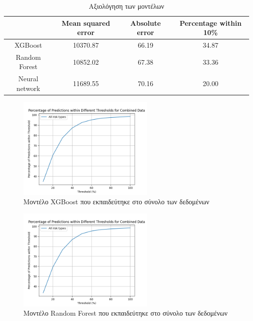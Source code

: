 \documentclass{llncs}
\begin{document}
\begin{table}[h]
    \centering
    \begin{tabular}{|c|c|c|c|} %
        \hline
         &Mean squared error & Absolute error & Percentage within 10\% \\ %
        \hline
        XGBoost & 10370.87 & 66.19 & 34.87 \\
        Random Forest & 10852.02 & 67.38 & 33.36 \\
        Neural network & 11689.55 & 70.16 & 20.00 \\
        \hline
    \end{tabular}
    \caption{Αξιολόγηση των μοντέλων}
    \label{tab:3x3table}
\end{table}

\begin{figure}
    \begin{center}
        \includegraphics[width=0.6\textwidth]{images/combined_trained_all_thresholds_xgb.png}
    \end{center}
    \caption{Μοντέλο XGBoost που εκπαιδεύτηκε στο σύνολο των δεδομένων}  
    \label{fig:XGBoost_result}  
\end{figure}

\begin{figure}
    \begin{center}
        \includegraphics[width=0.6\textwidth]{images/combined_trained_all_thresholds_random_forest.png}
    \end{center}
    \caption{Μοντέλο Random Forest που εκπαιδεύτηκε στο σύνολο των δεδομένων}  
    \label{fig:random_forest_result}  
\end{figure}
\end{document}
